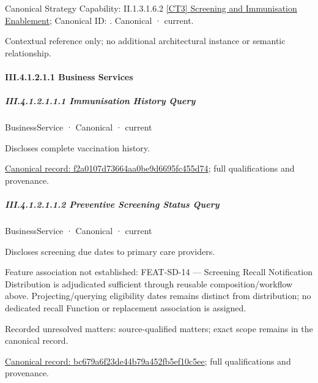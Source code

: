 {\small Canonical Strategy Capability: II.1.3.1.6.2 \hyperref[element:3e9016eaebae4ed0b67a5cacba2652f5]{[CT3] Screening and Immunisation Enablement}; Canonical ID: \texttt{}. Canonical · current.}\par
Contextual reference only; no additional architectural instance or semantic relationship.\par
\paragraph*{III.4.1.2.1.1 Business Services}
\label{navigation:III.4.1.2.1.1}

\subparagraph*{III.4.1.2.1.1.1 Immunisation History Query}
\label{navigation:III.4.1.2.1.1.1}

\label{element:f2a0107d73664aa0be9d6695fc455d74}
{\small BusinessService · Canonical · current}\par

Discloses complete vaccination history.


{\footnotesize \href{../../../../../../../continuum/business/business-service/f2a0107d73664aa0be9d6695fc455d74.md}{Canonical record: f2a0107d73664aa0be9d6695fc455d74}; full qualifications and provenance.}\par
\subparagraph*{III.4.1.2.1.1.2 Preventive Screening Status Query}
\label{navigation:III.4.1.2.1.1.2}

\label{element:bc679a6f23de44b79a452fb5ef10c5ee}
{\small BusinessService · Canonical · current}\par

Discloses screening due dates to primary care providers.



Feature association not established: FEAT-SD-14 — Screening Recall Notification Distribution is adjudicated sufficient through reusable composition/workflow above. Projecting/querying eligibility dates remains distinct from distribution; no dedicated recall Function or replacement association is assigned.


{\small Recorded unresolved matters: source-qualified matters; exact scope remains in the canonical record.}\par
{\footnotesize \href{../../../../../../../continuum/business/business-service/bc679a6f23de44b79a452fb5ef10c5ee.md}{Canonical record: bc679a6f23de44b79a452fb5ef10c5ee}; full qualifications and provenance.}\par
